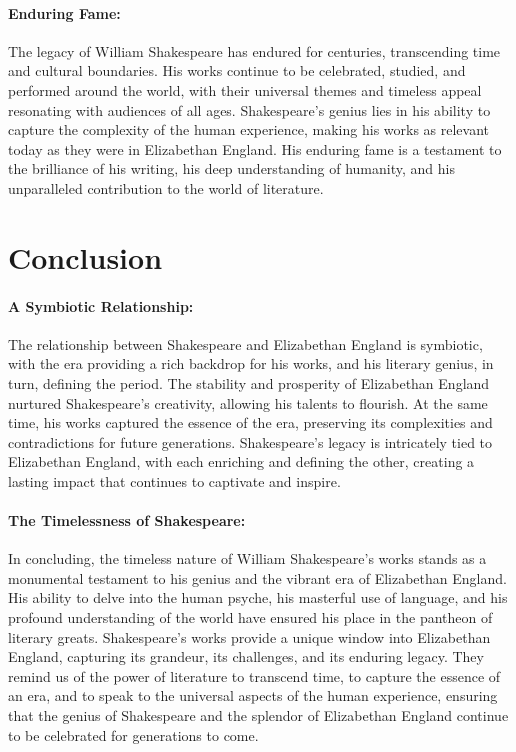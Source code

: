 \documentclass[a4paper,12pt]{book}
\begin{document}
\paragraph{Enduring Fame:}
The legacy of William Shakespeare has endured for centuries, transcending time and cultural boundaries. His works continue to be celebrated, studied, and performed around the world, with their universal themes and timeless appeal resonating with audiences of all ages. Shakespeare’s genius lies in his ability to capture the complexity of the human experience, making his works as relevant today as they were in Elizabethan England. His enduring fame is a testament to the brilliance of his writing, his deep understanding of humanity, and his unparalleled contribution to the world of literature.

\section*{Conclusion}

\paragraph{A Symbiotic Relationship:}
The relationship between Shakespeare and Elizabethan England is symbiotic, with the era providing a rich backdrop for his works, and his literary genius, in turn, defining the period. The stability and prosperity of Elizabethan England nurtured Shakespeare’s creativity, allowing his talents to flourish. At the same time, his works captured the essence of the era, preserving its complexities and contradictions for future generations. Shakespeare’s legacy is intricately tied to Elizabethan England, with each enriching and defining the other, creating a lasting impact that continues to captivate and inspire.

\paragraph{The Timelessness of Shakespeare:}
In concluding, the timeless nature of William Shakespeare’s works stands as a monumental testament to his genius and the vibrant era of Elizabethan England. His ability to delve into the human psyche, his masterful use of language, and his profound understanding of the world have ensured his place in the pantheon of literary greats. Shakespeare’s works provide a unique window into Elizabethan England, capturing its grandeur, its challenges, and its enduring legacy. They remind us of the power of literature to transcend time, to capture the essence of an era, and to speak to the universal aspects of the human experience, ensuring that the genius of Shakespeare and the splendor of Elizabethan England continue to be celebrated for generations to come.
\end{document}
